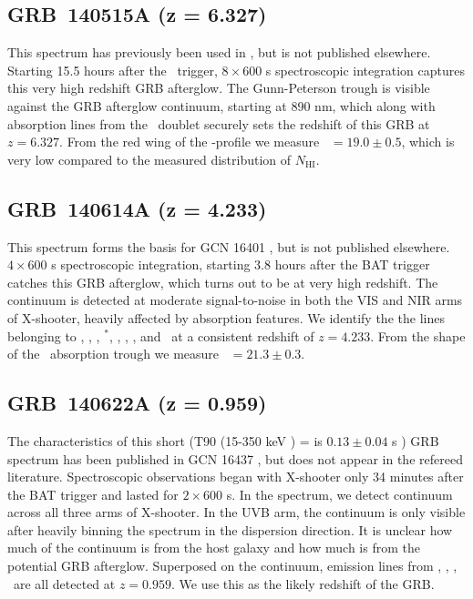 \documentclass{aa}    %
\begin{document}
\subsection{GRB~140515A (z = 6.327)}\label{140515}

This spectrum has previously been used in \citet{Melandri2015}, but is not
published elsewhere. Starting 15.5 hours after the \swift~trigger, $8\times600$
s spectroscopic integration captures this very high redshift GRB afterglow. The
Gunn-Peterson trough is visible against the GRB afterglow continuum, starting at
890 nm, which along with absorption lines from the \mgii~doublet securely sets
the redshift of this GRB at $z = 6.327$. From the red wing of the \lya-profile
we measure \nh~$=19.0 \pm 0.5$, which is very low compared to the measured
distribution of $N_{\mathrm{HI}}$.

\subsection{GRB~140614A (z = 4.233)}\label{140614}

This spectrum forms the basis for GCN 16401 \citep{GCN16401}, but is not
published elsewhere. $4\times600$ s spectroscopic integration, starting 3.8
hours after the BAT trigger catches this GRB afterglow, which turns out to be at
very high redshift. The continuum is detected at moderate signal-to-noise in
both the VIS and NIR arms of X-shooter, heavily affected by absorption features.
We identify the the lines belonging to \lya, \SIii, \cii, \cii$^*$, \alii,
\aliii, \feii, and \mgii~at a consistent redshift of $z = 4.233$. From the shape
of the \lya~absorption trough we measure \nh~$=21.3 \pm 0.3$.

\subsection{GRB~140622A (z = 0.959)}\label{140622}

The characteristics of this short (T90 (15-350 keV ) = is $0.13 \pm 0.04$ s
\citep{Lien2016}) GRB spectrum has been published in GCN 16437 \citep{GCN16437},
but does not appear in the refereed literature. Spectroscopic observations began
with X-shooter only 34 minutes after the BAT trigger and lasted for $2\times600$
s. In the spectrum, we detect continuum across all three arms of X-shooter. In
the UVB arm, the continuum is only visible after heavily binning the spectrum in
the dispersion direction. It is unclear how much of the continuum is from the
host galaxy and how much is from the potential GRB afterglow. Superposed on the
continuum, emission lines from \oii, \hb, \oiii, \ha~are all detected at $z =
0.959$. We use this as the likely redshift of the GRB.
\end{document}
